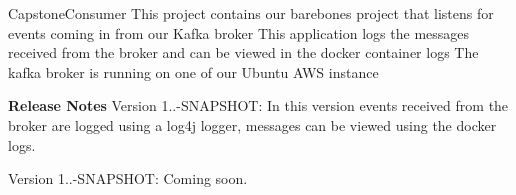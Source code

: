 Capstone\+Consumer This project contains our barebones project that listens for events coming in from our Kafka broker This application logs the messages received from the broker and can be viewed in the docker container logs The kafka broker is running on one of our Ubuntu AWS instance

{\bfseries{Release Notes}} Version 1..-\/SNAPSHOT\+: In this version events received from the broker are logged using a log4j logger, messages can be viewed using the docker logs.

Version 1..-\/SNAPSHOT\+: Coming soon. 